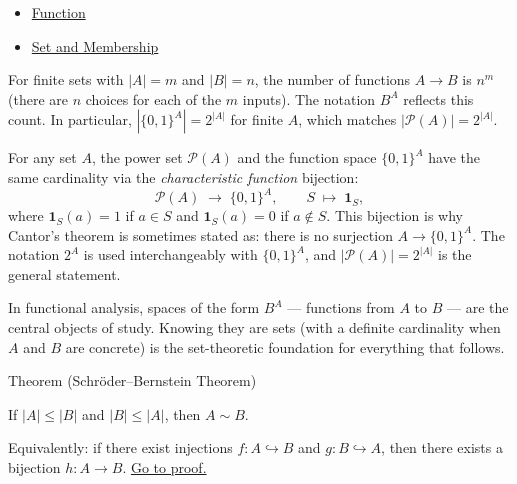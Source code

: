 \begin{dependencies}
\begin{itemize}
  \item \hyperref[def:function]{Function}
  \item \hyperref[def:set-membership]{Set and Membership}
\end{itemize}
\end{dependencies}

\begin{remark*}
For finite sets with $|A| = m$ and $|B| = n$, the number of functions
$A \to B$ is $n^m$ (there are $n$ choices for each of the $m$ inputs).
The notation $B^A$ reflects this count. In particular, $|\{0,1\}^A| = 2^{|A|}$
for finite $A$, which matches $|\mathcal{P}(A)| = 2^{|A|}$.
\end{remark*}

\begin{remark*}
\label{rem:characteristic-fn}
For any set $A$, the power set $\mathcal{P}(A)$ and the function space
$\{0,1\}^A$ have the same cardinality via the \emph{characteristic function}
bijection:
\[
\mathcal{P}(A) \;\to\; \{0,1\}^A,
\qquad
S \;\mapsto\; \mathbf{1}_S,
\]
where $\mathbf{1}_S(a) = 1$ if $a \in S$ and $\mathbf{1}_S(a) = 0$ if
$a \notin S$. This bijection is why Cantor's theorem is sometimes stated as:
there is no surjection $A \to \{0,1\}^A$. The notation $2^A$ is used
interchangeably with $\{0,1\}^A$, and $|\mathcal{P}(A)| = 2^{|A|}$ is
the general statement.

In functional analysis, spaces of the form $B^A$ — functions from $A$ to
$B$ — are the central objects of study. Knowing they are sets (with a definite
cardinality when $A$ and $B$ are concrete) is the set-theoretic foundation
for everything that follows.
\end{remark*}


\begin{theorembox}{Theorem (Schröder--Bernstein Theorem)}
\begin{theorem}\label{thm:schroder-bernstein}
If $|A| \leq |B|$ and $|B| \leq |A|$, then $A \sim B$.

Equivalently: if there exist injections $f : A \hookrightarrow B$ and
$g : B \hookrightarrow A$, then there exists a bijection $h : A \to B$.
\hyperref[prf:schroder-bernstein]{Go to proof.}
\end{theorem}
\end{theorembox}

